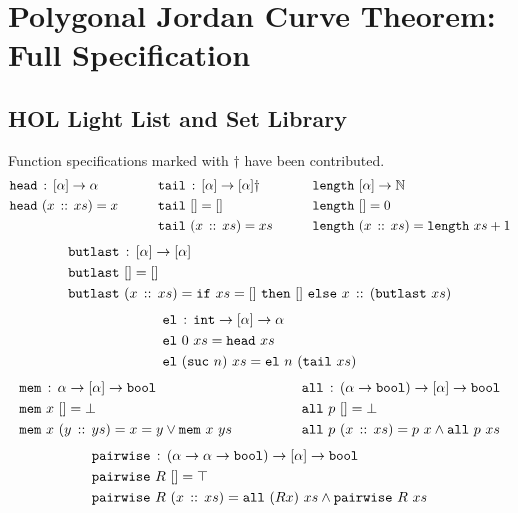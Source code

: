 \chapter{Polygonal Jordan Curve Theorem: Full Specification}
\label{app:JordanVerification}

\section{HOL Light List and Set Library}
Function specifications marked with $\dag$ have been contributed.
\begin{alignat*}{3}
  & \texttt{head}\,:\,[\alpha] \rightarrow \alpha &\qquad
  & \texttt{tail}\,:\,[\alpha] \rightarrow [\alpha]\dag &\qquad
  & \texttt{length}\ [\alpha]\rightarrow \mathbb{N}\\
  & \texttt{head}\ (x\,::\,xs) = x &\qquad
  & \texttt{tail}\ [] = [] &\qquad
  & \texttt{length}\ [] = 0\\
  & &\qquad
  &\texttt{tail}\ (x\,::\,xs) = xs &\qquad
  & \texttt{length}\ (x\,::\,xs) = \texttt{length}\ xs + 1
\end{alignat*}
\begin{align*}
  &\code{butlast}\,:\,[\alpha] \rightarrow [\alpha]\\
  &\code{butlast}\ [] = []\\
  &\code{butlast}\ (\cons{x}{xs}) = \code{if}\ xs=[]\ \code{then}\ []\ \code{else}\ \cons{x}{(\code{butlast}\ xs)}
\end{align*}
\begin{align*}
  &\texttt{el}\,:\,\texttt{int} \rightarrow [\alpha] \rightarrow \alpha\\
  &\texttt{el}\ 0\ xs = \texttt{head}\ xs\\
  &\texttt{el}\ (\texttt{suc}\ n)\ xs = \texttt{el}\ n\ (\texttt{tail}\ xs)
\end{align*}
\begin{align*}
  & \texttt{mem}\,:\,\alpha \rightarrow [\alpha] \rightarrow \texttt{bool} &\qquad\qquad
  & \texttt{all}\,:\,(\alpha\rightarrow\texttt{bool}) \rightarrow [\alpha] \rightarrow \texttt{bool}\\
  & \texttt{mem}\ x\ [] = \bot &\qquad\qquad
  & \texttt{all}\ p\ [] = \bot\\
  & \texttt{mem}\ x\ (y\,::\,ys) = x = y \vee \texttt{mem}\ x\ ys &\qquad\qquad
  & \texttt{all}\ p\ (x\,::\,xs) = p\ x \wedge \texttt{all}\ p\ xs   
\end{align*}
\begin{align*}
  & \texttt{pairwise}\,:\,(\alpha \rightarrow \alpha \rightarrow \texttt{bool}) \rightarrow [\alpha] \rightarrow \texttt{bool}\\
  & \texttt{pairwise}\ R\ [] = \top\\
  & \texttt{pairwise}\ R\ (x\,::\,xs) = \texttt{all}\ (R x)\ xs \wedge \texttt{pairwise}\ R\ xs
\end{align*}
